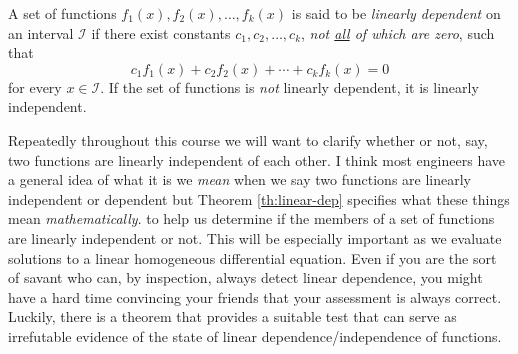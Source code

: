 \begin{theorem}
A set of functions $f_1(x),f_2(x),\dots,f_k(x)$ is said to be \emph{linearly dependent} on an interval $\mathcal{I}$ if there exist constants $c_1,c_2,\dots,c_k$, \emph{not \underline{all} of which are zero}, such that
$$c_1f_1(x) + c_2f_2(x)+\cdots+c_kf_k(x) = 0$$
\noindent for every $x \in \mathcal{I}$.  If the set of functions is \emph{not} linearly dependent, it is linearly independent.
\label{th:linear-dep}
\end{theorem} 
Repeatedly throughout this course we will want to clarify whether or not, say, two functions are linearly independent of each other.  I think most engineers have a general idea of what it is we \emph{mean} when we say two functions are linearly independent or dependent but Theorem \ref{th:linear-dep} specifies what these things mean \emph{mathematically}.  
 to help us determine if the members of a set of functions are linearly independent or not. This will be especially important as we evaluate solutions to a linear homogeneous differential equation.  Even if you are the sort of savant who can, by inspection, always detect linear dependence, you might have a hard time convincing your friends that your assessment is always correct.  Luckily, there is a theorem that provides a suitable test that can serve as irrefutable evidence of the state of linear dependence/independence of functions.

